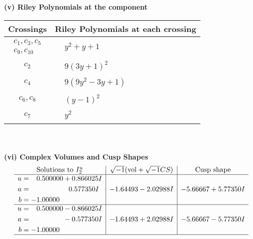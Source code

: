 \documentclass[1p]{elsarticle_modified}
\theoremstyle{definition}
\newcommand{\I}{\sqrt{-1}}
\begin{document}
\newpage\renewcommand{\arraystretch}{1}
\flushleft \textbf{(v) Riley Polynomials at the component}\newline \\
\begin{tabular}{m{50pt}|m{274pt}}
Crossings & \hspace{64pt}Riley Polynomials at each crossing \\
\hline $$\begin{aligned}c_{1},c_{3},c_{5}\\c_{9},c_{10}\end{aligned}$$&$\begin{aligned}
&y^2+y+1
\end{aligned}$\\
\hline $$\begin{aligned}c_{2}\end{aligned}$$&$\begin{aligned}
&9(3 y+1)^2
\end{aligned}$\\
\hline $$\begin{aligned}c_{4}\end{aligned}$$&$\begin{aligned}
&9(9 y^2-3 y+1)
\end{aligned}$\\
\hline $$\begin{aligned}c_{6},c_{8}\end{aligned}$$&$\begin{aligned}
&(y-1)^2
\end{aligned}$\\
\hline $$\begin{aligned}c_{7}\end{aligned}$$&$\begin{aligned}
&y^2
\end{aligned}$\\
\hline
\end{tabular}\\~\\
\newpage\flushleft \textbf{(vi) Complex Volumes and Cusp Shapes}
$$\begin{array}{c|c|c}  
\text{Solutions to }I^u_{2}& \I (\text{vol} + \sqrt{-1}CS) & \text{Cusp shape}\\
 \hline 
\begin{aligned}
u &= \phantom{-}0.500000 + 0.866025 I \\
a &= \phantom{-0.000000 -}0.577350 I \\
b &= -1.00000\phantom{ +0.000000I}\end{aligned}
 & -1.64493 - 2.02988 I & -5.66667 + 5.77350 I \\ \hline\begin{aligned}
u &= \phantom{-}0.500000 - 0.866025 I \\
a &= \phantom{-0.000000 } -0.577350 I \\
b &= -1.00000\phantom{ +0.000000I}\end{aligned}
 & -1.64493 + 2.02988 I & -5.66667 - 5.77350 I\\
 \hline 
 \end{array}$$\newpage
\end{document}
